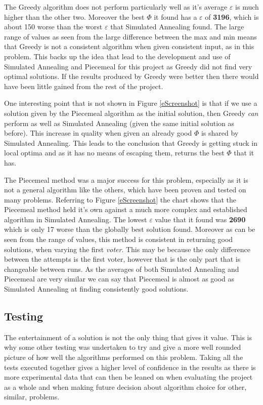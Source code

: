 \documentclass[12pt]{report}
\begin{document}
The Greedy algorithm does not perform particularly well as it's average $\varepsilon$ is much higher than the other two. Moreover the best $\Phi$ it found has a $\varepsilon$ of \textbf{3196}, which is about 150 worse than the worst $\varepsilon$ that Simulated Annealing found. The large range of values as seen from the large difference between the max and min means that Greedy is not a consistent algorithm when given consistent input, as in this problem. This backs up the idea that lead to the development and use of Simulated Annealing and Piecemeal for this project as Greedy did not find very optimal solutions. If the results produced by Greedy were better then there would have been little gained from the rest of the project. 

One interesting point that is not shown in Figure \ref{eScreenshot} is that if we use a solution given by the Piecemeal algorithm as the initial solution, then Greedy \textit{can} perform as well as Simulated Annealing (given the same initial solution as before). This increase in quality when given an already good $\Phi$ is shared by Simulated Annealing. This leads to the conclusion that Greedy is getting stuck in local optima and as it has no means of escaping them, returns the best $\Phi$ that it has.

The Piecemeal method was a major success for this problem, especially as it is not a general algorithm like the others, which have been proven and tested on many problems. Referring to Figure \ref{eScreenshot} the chart shows that the Piecemeal method held it's own against a much more complex and established algorithm in Simulated Annealing. The lowest $\varepsilon$ value that it found was \textbf{2690} which is only 17 worse than the globally best solution found. Moreover as can be seen from the range of values, this method is consistent in returning good solutions, when varying the first \textit{voter}. This may be because the only difference between the attempts is the first voter, however that is the only part that is changeable between runs. As the averages of both Simulated Annealing and Piecemeal are very similar we can say that Piecemeal is almost as good as Simulated Annealing at finding consistently good solutions.


\subsection{Testing}\label{OtherTesting}
The entertainment of a solution is not the only thing that gives it value. This is why some other testing was undertaken to try and give a more well rounded picture of how well the algorithms performed on this problem. Taking all the tests executed together gives a higher level of confidence in the results as there is more experimental data that can then be leaned on when evaluating the project as a whole and when making future decision about algorithm choice for other, similar, problems.
\end{document}
